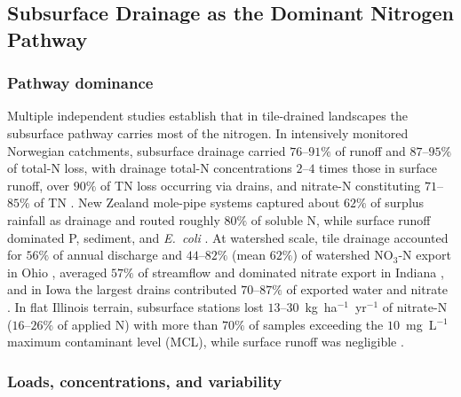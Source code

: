 \subsection{Subsurface Drainage as the Dominant Nitrogen Pathway}

\subsubsection{Pathway dominance}

Multiple independent studies establish that in tile-drained landscapes the
subsurface pathway carries most of the nitrogen. In intensively monitored
Norwegian catchments, subsurface drainage carried $76$--$91\%$ of runoff
and $87$--$95\%$ of total-N loss, with drainage total-N concentrations
$2$--$4$ times those in surface runoff, over $90\%$ of TN loss occurring
via drains, and nitrate-N constituting $71$--$85\%$ of TN
\parencite{Bechmann2014}. New Zealand mole-pipe systems captured about
$62\%$ of surplus rainfall as drainage and routed roughly $80\%$ of soluble
N, while surface runoff dominated P, sediment, and \emph{E.\ coli}
\parencite{Monaghan2016}. At watershed scale, tile drainage accounted for
$56\%$ of annual discharge and $44$--$82\%$ (mean $62\%$) of watershed
NO$_3$-N export in Ohio \parencite{Williams2015}, averaged $57\%$ of
streamflow and dominated nitrate export in Indiana \parencite{Grose2022},
and in Iowa the largest drains contributed $70$--$87\%$ of exported water
and nitrate \parencite{Coupe2020}. In flat Illinois terrain, subsurface
stations lost $13$--$30$~kg~ha$^{-1}$~yr$^{-1}$ of nitrate-N
($16$--$26\%$ of applied N) with more than $70\%$ of samples exceeding the
$10$~mg~L$^{-1}$ maximum contaminant level (MCL), while surface runoff was
negligible \parencite{Dattamudi2020}.

\subsubsection{Loads, concentrations, and variability}

